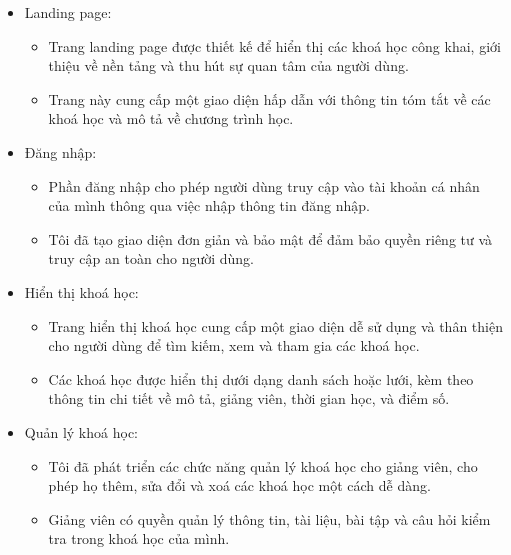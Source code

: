 \documentclass[../Thesis.tex]{subfiles}
\begin{document}
    \begin{itemize}
        \item Landing page:
            \begin{itemize}
                \item Trang landing page được thiết kế để hiển thị các khoá học công khai, giới thiệu về nền tảng và thu hút sự quan tâm của người dùng.
                \item Trang này cung cấp một giao diện hấp dẫn với thông tin tóm tắt về các khoá học và mô tả về chương trình học.
            \end{itemize}
        \item Đăng nhập:
            \begin{itemize}
                \item Phần đăng nhập cho phép người dùng truy cập vào tài khoản cá nhân của mình thông qua việc nhập thông tin đăng nhập.
                \item Tôi đã tạo giao diện đơn giản và bảo mật để đảm bảo quyền riêng tư và truy cập an toàn cho người dùng.
            \end{itemize}
    
        \item Hiển thị khoá học:
            \begin{itemize}
    
                \item Trang hiển thị khoá học cung cấp một giao diện dễ sử dụng và thân thiện cho người dùng để tìm kiếm, xem và tham gia các khoá học.
                \item Các khoá học được hiển thị dưới dạng danh sách hoặc lưới, kèm theo thông tin chi tiết về mô tả, giảng viên, thời gian học, và điểm số.
            \end{itemize}
        \item Quản lý khoá học:
            \begin{itemize}
                \item Tôi đã phát triển các chức năng quản lý khoá học cho giảng viên, cho phép họ thêm, sửa đổi và xoá các khoá học một cách dễ dàng.
                \item Giảng viên có quyền quản lý thông tin, tài liệu, bài tập và câu hỏi kiểm tra trong khoá học của mình.
            \end{itemize}
   

\end{itemize}
\end{document}
